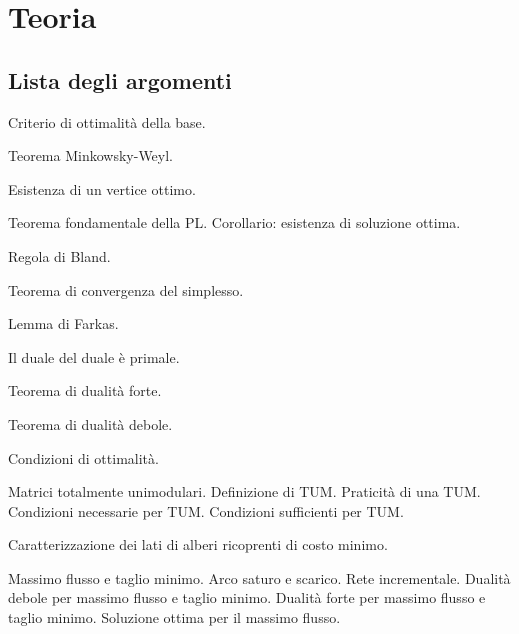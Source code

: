 \documentclass[\main/main.tex]{subfiles}
\begin{document}
\chapter{Teoria}

\section*{Lista degli argomenti}
\begin{todolist}
  \item Criterio di ottimalità della base.
  \item Teorema Minkowsky-Weyl.
  \item Esistenza di un vertice ottimo.
  \item Teorema fondamentale della PL.
  \subitem Corollario: esistenza di soluzione ottima.
  \item Regola di Bland.
  \item Teorema di convergenza del simplesso.
  \item Lemma di Farkas.
  \item Il duale del duale è primale.
  \item Teorema di dualità forte.
  \item Teorema di dualità debole.
  \item Condizioni di ottimalità.
  \item Matrici totalmente unimodulari.
  \subitem Definizione di TUM.
  \subitem Praticità di una TUM.
  \subitem Condizioni necessarie per TUM.
  \subitem Condizioni sufficienti per TUM.
  \item Caratterizzazione dei lati di alberi ricoprenti di costo minimo.
  \item Massimo flusso e taglio minimo.
  \subitem Arco saturo e scarico.
  \subitem Rete incrementale.
  \subitem Dualità debole per massimo flusso e taglio minimo.
  \subitem Dualità forte per massimo flusso e taglio minimo.
  \subitem Soluzione ottima per il massimo flusso.
\end{todolist}

\clearpage




\clearpage

\clearpage


\clearpage





\clearpage

\clearpage

\clearpage

\end{document}
